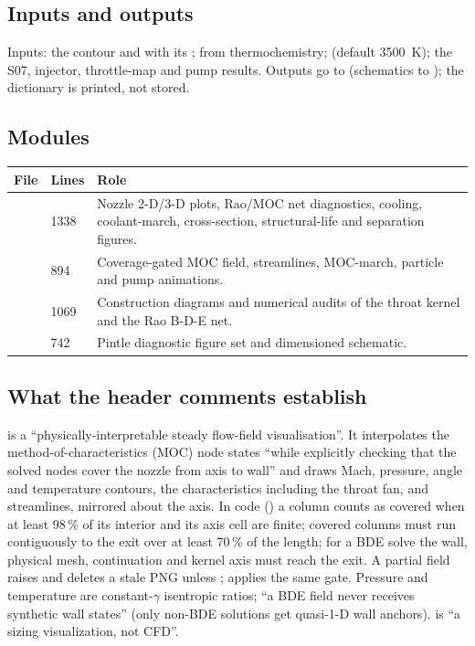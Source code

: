 \subsection{Inputs and outputs}

Inputs: the contour and  with its ;  from thermochemistry;  (default 3500~K); the S07, injector, throttle-map and pump results. Outputs go to  (schematics to ); the  dictionary is printed, not stored.

\subsection{Modules}

\begingroup\small
\begin{longtable}{@{}P{4.2cm}P{1.0cm}P{11.0cm}@{}}
\toprule
\textbf{File} & \textbf{Lines} & \textbf{Role} \\
\midrule
\endhead
{} & 1338 & Nozzle 2-D/3-D plots, Rao/MOC net diagnostics, cooling, coolant-march, cross-section, structural-life and separation figures. \\
 & 894 & Coverage-gated MOC field, streamlines, MOC-march, particle and pump animations. \\
 & 1069 & Construction diagrams and numerical audits of the throat kernel and the Rao B-D-E net. \\
 & 742 & Pintle diagnostic figure set and dimensioned schematic. \\
\bottomrule
\end{longtable}
\endgroup

\subsection{What the header comments establish}

\textbf{} is a ``physically-interpretable steady flow-field visualisation''. It interpolates the method-of-characteristics (MOC) node states ``while explicitly checking that the solved nodes cover the nozzle from axis to wall'' and draws Mach, pressure, angle and temperature contours, the characteristics including the throat fan, and streamlines, mirrored about the axis. In code () a column counts as covered when at least 98\,\% of its interior and its axis cell are finite; covered columns must run contiguously to the exit over at least 70\,\% of the length; for a BDE solve the wall, physical mesh, continuation and kernel axis must reach the exit. A partial field raises  and deletes a stale PNG unless ;  applies the same gate. Pressure and temperature are constant-$\gamma$ isentropic ratios; ``a BDE field never receives synthetic wall states'' (only non-BDE solutions get quasi-1-D wall anchors).  is ``a sizing visualization, not CFD''.

